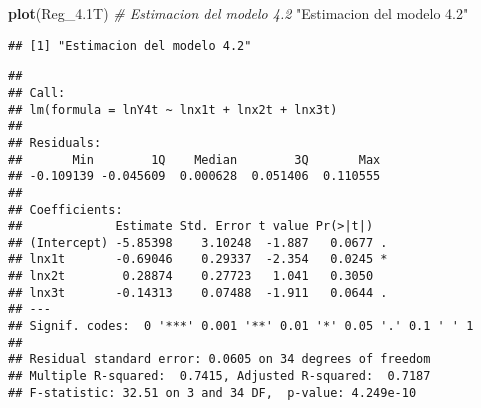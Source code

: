 \documentclass[
]{article}
\newenvironment{Shaded}{\begin{snugshade}}{\end{snugshade}}
\newcommand{\CommentTok}[1]{\textcolor[rgb]{0.56,0.35,0.01}{\textit{#1}}}
\newcommand{\FloatTok}[1]{\textcolor[rgb]{0.00,0.00,0.81}{#1}}
\newcommand{\KeywordTok}[1]{\textcolor[rgb]{0.13,0.29,0.53}{\textbf{#1}}}
\newcommand{\NormalTok}[1]{#1}
\newcommand{\OperatorTok}[1]{\textcolor[rgb]{0.81,0.36,0.00}{\textbf{#1}}}
\newcommand{\StringTok}[1]{\textcolor[rgb]{0.31,0.60,0.02}{#1}}
\begin{document}
\begin{Shaded}
\begin{Highlighting}[]
\KeywordTok{plot}\NormalTok{(Reg_}\FloatTok{4.1}\NormalTok{T)}
\CommentTok{# Estimacion del modelo 4.2}
\StringTok{"Estimacion del modelo 4.2"}
\end{Highlighting}
\end{Shaded}

\begin{verbatim}
## [1] "Estimacion del modelo 4.2"
\end{verbatim}

\begin{Shaded}
\end{Shaded}

\begin{verbatim}
## 
## Call:
## lm(formula = lnY4t ~ lnx1t + lnx2t + lnx3t)
## 
## Residuals:
##       Min        1Q    Median        3Q       Max 
## -0.109139 -0.045609  0.000628  0.051406  0.110555 
## 
## Coefficients:
##             Estimate Std. Error t value Pr(>|t|)  
## (Intercept) -5.85398    3.10248  -1.887   0.0677 .
## lnx1t       -0.69046    0.29337  -2.354   0.0245 *
## lnx2t        0.28874    0.27723   1.041   0.3050  
## lnx3t       -0.14313    0.07488  -1.911   0.0644 .
## ---
## Signif. codes:  0 '***' 0.001 '**' 0.01 '*' 0.05 '.' 0.1 ' ' 1
## 
## Residual standard error: 0.0605 on 34 degrees of freedom
## Multiple R-squared:  0.7415, Adjusted R-squared:  0.7187 
## F-statistic: 32.51 on 3 and 34 DF,  p-value: 4.249e-10
\end{verbatim}
\end{document}
